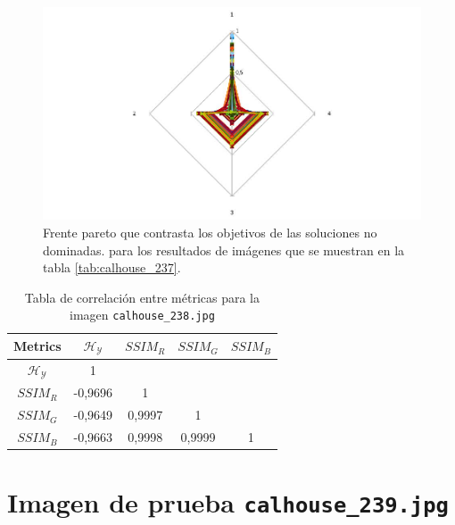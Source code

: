    \begin{figure}[H]
    \centering
    \includegraphics[width=\textwidth]{./Figures/calhouse_237/calhouse_237_2.jpg}
    \caption{Frente pareto que contrasta los objetivos de las soluciones no dominadas. para los resultados de imágenes que se muestran en la tabla \ref{tab:calhouse_237}.}
    \label{fig:calhouse2372fp}
    \end{figure}

\begin{table}[H]
\setlength{\abovecaptionskip}{2pt plus 3pt minus 2pt} %
\caption[Parámetros de entrada para $MOPSO$]{Tabla de correlación entre métricas para la imagen \texttt{calhouse\_238.jpg}}
\begin{center}
 \begin{tabular}{||c | c c c c||} 
 \hline
Metrics & $\mathscr{H_Y}$ & $SSIM_R$ & $SSIM_G$ & $SSIM_B$ \\ 
\hline
$\mathscr{H_Y}$ & 1 &  &  & \\ 
\hline
$SSIM_R$ & -0,9696 & 1 &  \\ 
\hline
$SSIM_G$ & -0,9649 & 0,9997  & 1  & \\ 
\hline
$SSIM_B$ & -0,9663 & 0,9998  & 0,9999  & 1 \\ 
\hline
\end{tabular}
\end{center}
\label{table:correlacion}
\end{table}


\section{Imagen de prueba \texttt{calhouse\_239.jpg}}

